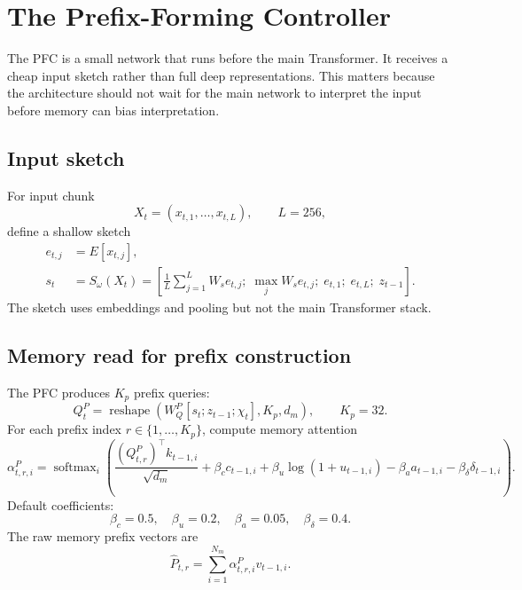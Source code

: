 \documentclass[11pt]{article}
\newcommand{\softmax}{\operatorname{softmax}}
\begin{document}
\section{The Prefix-Forming Controller}

The PFC is a small network that runs before the main Transformer. It receives a cheap input sketch rather than full deep representations. This matters because the architecture should not wait for the main network to interpret the input before memory can bias interpretation.

\subsection{Input sketch}

For input chunk
\begin{equation}
    X_t=(x_{t,1},\ldots,x_{t,L}), \qquad L=256,
\end{equation}
define a shallow sketch
\begin{align}
    e_{t,j} &= E[x_{t,j}],\\
    s_t &= S_\omega(X_t)=\left[\frac{1}{L}\sum_{j=1}^L W_s e_{t,j};\; \max_j W_s e_{t,j};\; e_{t,1};\; e_{t,L};\; z_{t-1}\right].
\end{align}
The sketch uses embeddings and pooling but not the main Transformer stack.

\subsection{Memory read for prefix construction}

The PFC produces \(K_p\) prefix queries:
\begin{equation}
    Q_t^P = \operatorname{reshape}\left(W_Q^P[s_t;z_{t-1};\chi_t], K_p,d_m\right), \qquad K_p=32.
\end{equation}
For each prefix index \(r\in\{1,\ldots,K_p\}\), compute memory attention
\begin{equation}
    \alpha_{t,r,i}^{P} = \softmax_i\left(
        \frac{(Q_{t,r}^{P})^\top k_{t-1,i}}{\sqrt{d_m}}
        + \beta_c c_{t-1,i}
        + \beta_u \log(1+u_{t-1,i})
        - \beta_a a_{t-1,i}
        - \beta_\delta \delta_{t-1,i}
    \right).
\end{equation}
Default coefficients:
\begin{equation}
    \beta_c=0.5,\quad \beta_u=0.2,\quad \beta_a=0.05,\quad \beta_\delta=0.4.
\end{equation}
The raw memory prefix vectors are
\begin{equation}
    \hat{P}_{t,r}=\sum_{i=1}^{N_m}\alpha_{t,r,i}^{P}v_{t-1,i}.
\end{equation}
\end{document}
